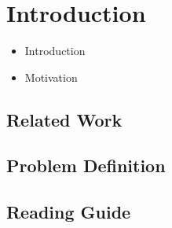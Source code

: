 \documentclass[./main.tex]{subfiles}
\begin{document}
\section{Introduction}
\begin{itemize}
    \item Introduction
    \item Motivation
\end{itemize}

\subsection{Related Work}

\subsection{Problem Definition}

\subsection{Reading Guide}
\end{document}
